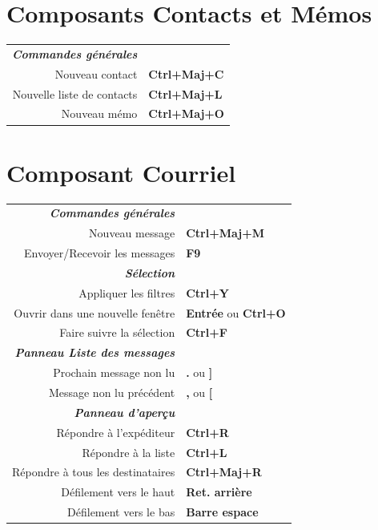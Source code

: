 \documentclass[12pt]{article}
\begin{document}
\begin{landscape}
\begin{center}
\begin{multicols}{2}
	\section*{Composants Contacts et Mémos}
	\begin{tabular*}{4in}{rp{1.5in}}
		\textit{\textbf{Commandes générales}}	&					\\
		Nouveau contact				& \textbf{Ctrl+Maj+C}			\\
		Nouvelle liste de contacts			& \textbf{Ctrl+Maj+L}			\\
		Nouveau mémo				& \textbf{Ctrl+Maj+O}			\\
	\end{tabular*}
	\section*{Composant Courriel}
	\begin{tabular*}{4in}{rp{1.5in}}
		\textit{\textbf{Commandes générales}}	&					\\
		Nouveau message				& \textbf{Ctrl+Maj+M}			\\
		\vspace{1.5mm}
		Envoyer/Recevoir les messages		& \textbf{F9}				\\
		\textit{\textbf{Sélection}}		&					\\
		Appliquer les filtres			& \textbf{Ctrl+Y}			\\
		Ouvrir dans une nouvelle fenêtre 	& \textbf{Entrée} ou \textbf{Ctrl+O}	\\
		\vspace{1.5mm}
		Faire suivre la sélection		& \textbf{Ctrl+F}			\\
		\textit{\textbf{Panneau Liste des messages}}	&					\\
		Prochain message non lu			& \textbf{.} ou \textbf{]}		\\
		\vspace{1.5mm}
		Message non lu précédent		& \textbf{,} ou \textbf{[}		\\
		\textit{\textbf{Panneau d'aperçu}}	&					\\
		Répondre à l'expéditeur			& \textbf{Ctrl+R}			\\
		Répondre à la liste			& \textbf{Ctrl+L}			\\
		Répondre à tous les destinataires 	& \textbf{Ctrl+Maj+R}			\\
		Défilement vers le haut			& \textbf{Ret. arrière}			\\
		Défilement vers le bas			& \textbf{Barre espace}			\\
	\end{tabular*}

\end{multicols}
\end{center}
\end{landscape}
\end{document}
